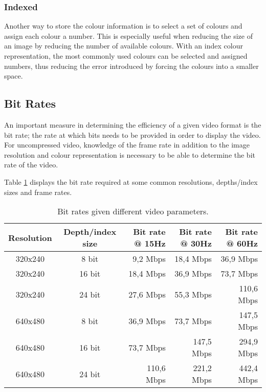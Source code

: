 \subsubsection{Indexed}
Another way to store the colour information is to select a set of colours and assign each colour a number.
This is especially useful when reducing the size of an image by reducing the number of available colours.
With an index colour representation, the most commonly used colours can be selected and assigned numbers, thus reducing the error introduced by forcing the colours into a smaller space.

\subsection{Bit Rates}
An important measure in determining the efficiency of a given video format is the bit rate; the rate at which bits needs to be provided in order to display the video.
For uncompressed video, knowledge of the frame rate in addition to the image resolution and colour representation is necessary to be able to determine the bit rate of the video.

Table \ref{tab:BitRates} displays the bit rate required at some common resolutions, depths/index sizes and frame rates.
\begin{table}[h]
    \centering
    \begin{tabular}{ccrrr}
        Resolution & Depth/index size & Bit rate @ 15Hz & Bit rate @ 30Hz & Bit rate @ 60Hz \\
        \hline
        320x240 & 8 bit & 9,2 Mbps   & 18,4 Mbps  & 36,9 Mbps  \\
        320x240 & 16 bit & 18,4 Mbps  & 36,9 Mbps  & 73,7 Mbps  \\
        320x240 & 24 bit & 27,6 Mbps  & 55,3 Mbps  & 110,6 Mbps \\
        640x480 & 8 bit & 36,9 Mbps  & 73,7 Mbps  & 147,5 Mbps \\
        640x480 & 16 bit & 73,7 Mbps  & 147,5 Mbps & 294,9 Mbps \\
        640x480 & 24 bit & 110,6 Mbps & 221,2 Mbps & 442,4 Mbps
    \end{tabular}
    \caption{Bit rates given different video parameters.}
    \label{tab:BitRates}
\end{table}
